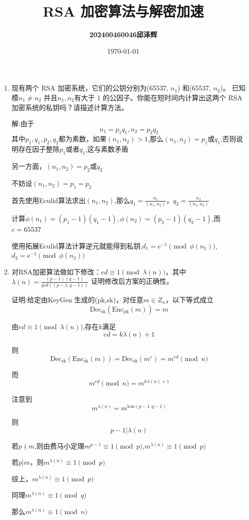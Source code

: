 \documentclass[12pt,a4paper]{article}
\title{
\textbf{\LARGE{RSA 加密算法与解密加速}}\\[0.5em]
}
\author{\textbf{202400460046邱泽辉}}
\date{\today}
\begin{document}
\maketitle
\thispagestyle{fancy} %
\begin{enumerate}
    \item 现有两个 RSA 加密系统，它们的公钥分别为(65537, \(n_1\)) 和(65537, \(n_2\))。
已知模\(n_1 \neq n_2\) 并且\(n_1,n_2\)有大于 1 的公因子。你能在短时间内计算出这两个 RSA
加密系统的私钥吗？请描述计算方法。

解:由于\[
    n_1 = p_1q_1,n_2 = p_2q_2
    \]
其中\(p_1,q_1,p_2,q_2\)都为素数，如果\((n_1,n_2)>1\),那么\((n_1,n_2) = \)\(p_1\)或\(q_1\),否则说明存在因子整除\(p_1\)或者\(q_1\),这与素数矛盾

另一方面，\((n_1,n_2) = \)\(p_2\)或\(q_2\)

不妨设\((n_1,n_2)=p_1=p_2\)

首先使用Eculid算法求出\((n_1,n_2)\),那么\(q_1 = \frac{n_1}{(n_1,n_2)}\)，\(q_2 = \frac{n_2}{(n_1,n_2)}\)

计算\(\phi(n_1)=(p_1-1)(q_1-1),\phi(n_2)=(p_2-1)(q_2-1)\),而\(e=65537\)

使用拓展Eculid算法计算逆元就能得到私钥,\(d_1 = e^{-1} \pmod{\phi(n_1)} \),\(d_2 = e^{-1} \pmod{\phi(n_2)} \)
    \item 对RSA加密算法做如下修改：\(ed\equiv 1 \pmod{\lambda(n)}\)，其中\(\lambda(n)=\frac{(p-1)(q-1)}{gcd((p-1,q-1))}\)
证明修改后方案的正确性。

证明:给定由KeyGen 生成的(pk,sk)，对任意\(m\in Z_n\)，以下等式成立
\[\text{Dec}_{\text{sk}}(\text{Enc}_{\text{pk}}(m))=m\]

由\(ed\equiv 1 \pmod{\lambda(n)}\),存在\(k\)满足\[ed = k\lambda(n)+1\]

则\[
\text{Dec}_{\text{sk}}(\text{Enc}_{\text{sk}}(m)) = \text{Dec}_{\text{sk}}(m^e) = m^{ed} \pmod n
\]

而\[
m^{ed} \pmod n = m^{k\lambda(n)+1}
\]

注意到\[
m^{\lambda(n)} = m^{\text{lcm}(p-1,q-1)}
\]

则
\[
p-1 | \lambda(n)
\]

若\(p\nmid m\),则由费马小定理\(m^{p-1} \equiv 1 \pmod p\),\(m^{\lambda(n)} \equiv 1 \pmod p\)

若\(p| m\)，则\(m^{\lambda(n)}\equiv 1 \pmod p\)

综上，\(m^{\lambda(n)}\equiv 1 \pmod p\)

同理\(m^{\lambda(n)}\equiv 1 \pmod q\)

那么\(m^{\lambda(n)}\equiv 1 \pmod n\)


\end{enumerate}
\end{document}
